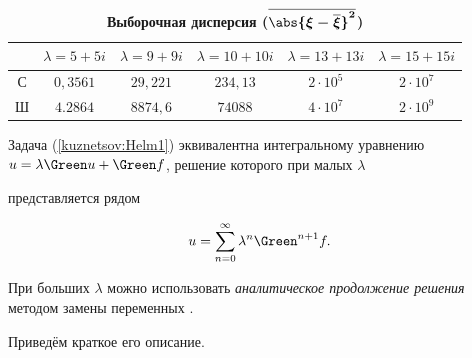     \begin{table}[h!] \centering



        \begin{minipage}[t]{115mm} \centering

\footnotesize\caption{\bf Выборочная дисперсия ($\boldsymbol{\overline{\abs{\xi-\overline\xi}^2}}$)}\label{kuznetsov:solDispEst1}\vspace{-3mm}

            \begin{tabular}{c|c|c|c|c|c}

              \hline

              &$\lambda=5+5i$&$\lambda=9+9i$&$\lambda=10+10i$&$\lambda=13+13i$&$\lambda=15+15i$\\

              \hline

              С&$0{,}3561$&$29{,}221$&$234{,}13$&$2\cdot10^5$&$2\cdot10^7$\\

              \hline

              Ш&$4.2864$&$8874{,}6$&$74088$&$4\cdot10^7$&$2\cdot10^9$\\

              \hline

            \end{tabular}

        \end{minipage}

    \end{table}




    Задача (\ref{kuznetsov:Helm1}) эквивалентна интегральному уравнению $u=\lambda\Green u+\Green f$,  решение которого при малых $\lambda$

представляется рядом

\begin{equation}

    u=\sum_{n=0}^\infty\lambda^n\Green^{n+1}f.

    \label{kuznetsov:HelmSum}

\end{equation}

    При больших $\lambda$ можно использовать \emph{аналитическое продолжение решения} методом замены переменных \cite{kuznetsov:Kublanovskaya}.

Приведём краткое его описание.



